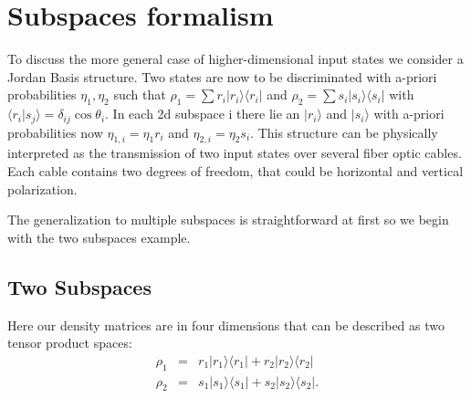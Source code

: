 \documentclass[12pt,oneside,english,reqno]{amsbook}
\numberwithin{section}{chapter}
\numberwithin{equation}{section}
\numberwithin{figure}{section}
\begin{document}
\section{Subspaces formalism}

To discuss the more general case of higher-dimensional input states we consider a Jordan Basis structure.
Two states are now to be discriminated with a-priori probabilities $\eta_1 , \eta_2$ such that $\rho_1 = \sum r_i \vert r_i \rangle \langle r_i \vert $ and $\rho_2 = \sum s_i \vert s_i \rangle \langle s_i \vert$ with $ \langle r_i \vert s_j \rangle = \delta_{ij} \cos \theta_i$. In each 2d subspace i there lie an $\vert r_i \rangle$ and  $\vert s_i \rangle$ with a-priori probabilities now
$\eta_{1,i} = \eta_1 r_i$ and $\eta_{2,i} = \eta_2 s_i$.  This structure can be physically interpreted as the transmission of two input states over several fiber optic cables. Each cable contains two degrees of freedom, that could be horizontal and vertical polarization.

The generalization to multiple subspaces is straightforward at first  so we begin with the two subspaces example.  

\subsection{Two Subspaces}
Here our density matrices are in four dimensions that can be described as two tensor product spaces:
\begin{eqnarray}
 \rho_1 &=& r_1 \vert r_1 \rangle \langle r_1 \vert  + r_2 \vert r_2 \rangle \langle r_2 \vert \\
 \rho_2 &=& s_1 \vert s_1 \rangle \langle s_1 \vert  + s_2 \vert s_2 \rangle \langle s_2 \vert. \nonumber\\
\end{eqnarray}
\end{document}
